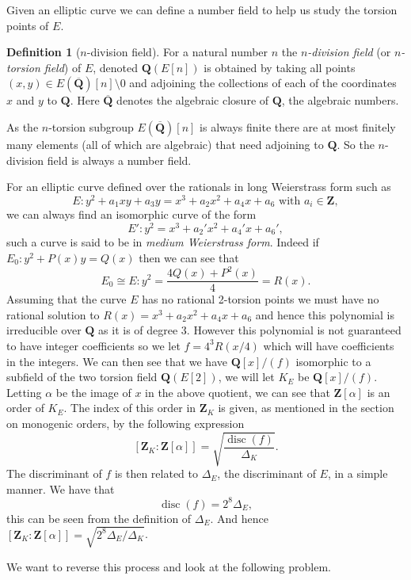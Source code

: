 \documentclass[12pt,a4paper,abstracton,bibtotoc]{scrreprt}
\theoremstyle{definition}
\newtheorem{defn}{Definition}
\newcommand{\QQ}{\mathbf{Q}}
\newcommand{\ZZ}{\mathbf{Z}}
\DeclareMathOperator{\disc}{disc}
\begin{document}
Given an elliptic curve we can define a number field to help us study the torsion points of $E$.

\begin{defn}[$n$-division field]
For a natural number $n$ the \emph{$n$-division field} (or \emph{$n$-torsion field}) of $E$, denoted $\QQ(E[n])$ is obtained by taking all points $(x,y) \in E(\overline{\QQ})[n]\setminus 0$ and adjoining the collections of each of the coordinates $x$ and $y$ to $\QQ$.
Here $\overline{\QQ}$ denotes the algebraic closure of $\QQ$, the algebraic numbers.
\end{defn}
As the $n$-torsion subgroup $E(\overline{\QQ})[n]$ is always finite there are at most finitely many elements (all of which are algebraic) that need adjoining to $\QQ$.
So the $n$-division field is always a number field.

\minisec{}

For an elliptic curve defined over the rationals in long Weierstrass form such as
\[
E \colon y^2 + a_1xy + a_3y = x^3 + a_2x^2 + a_4x + a_6\text{ with }a_i \in \ZZ,
\]
we can always find an isomorphic curve of the form
\[
E' \colon y^2 = x^3 + a_2'x^2 + a_4'x + a_6',
\]
such a curve is said to be in \emph{medium Weierstrass form}.
Indeed if $E_0\colon y^2 + P(x)y  = Q(x)$ then we can see that
\[
E_0\cong E \colon y^2 = \frac{4Q(x) + P^2(x)}{4} = R(x).
\]
Assuming that the curve $E$ has no rational 2-torsion points we must have no rational solution to $R(x) = x^3 + a_2x^2 + a_4x + a_6$ and hence this polynomial is irreducible over $\QQ$ as it is of degree 3.
However this polynomial is not guaranteed to have integer coefficients so we let $f = 4^3 R(x/4)$ which will have coefficients in the integers.
We can then see that we have $\QQ[x]/(f)$ isomorphic to a subfield of the two torsion field $\QQ(E[2])$, we will let $K_E$ be $\QQ[x]/(f)$.
Letting $\alpha$ be the image of $x$ in the above quotient, we can see that $\ZZ[\alpha]$ is an order of $K_E$.
The index of this order in $\ZZ_K$ is given, as mentioned in the section on monogenic orders, by the following expression
\[
[\ZZ_K:\ZZ[\alpha]] = \sqrt{\frac{\disc(f)}{\Delta_K}}.
\]
The discriminant of $f$ is then related to $\Delta_E$, the discriminant of $E$, in a simple manner.
We have that
\[
\disc(f) = 2^8 \Delta_E,
\]
this can be seen from the definition of $\Delta_E$.
And hence $[\ZZ_K:\ZZ[\alpha]] = \sqrt{2^8\Delta_E/\Delta_K}$.

We want to reverse this process and look at the following problem.
\end{document}
